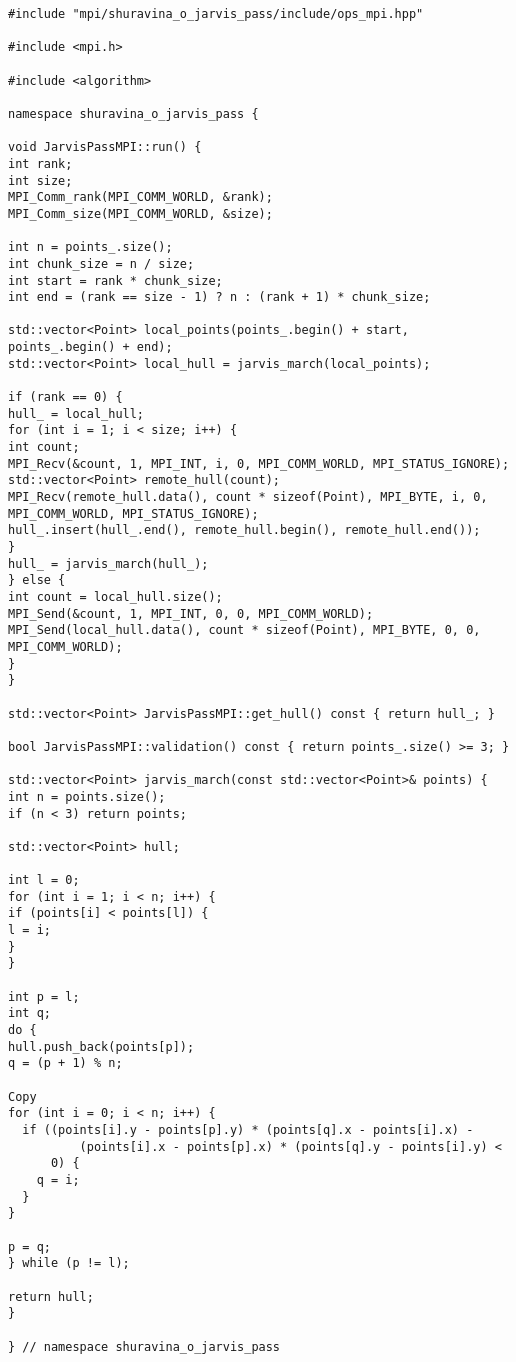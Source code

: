 \documentclass[12pt]{article}
\begin{document}
\newpage

\begin{lstlisting}[caption={ops_mpi_.cpp}]
#include "mpi/shuravina_o_jarvis_pass/include/ops_mpi.hpp"

#include <mpi.h>

#include <algorithm>

namespace shuravina_o_jarvis_pass {

void JarvisPassMPI::run() {
int rank;
int size;
MPI_Comm_rank(MPI_COMM_WORLD, &rank);
MPI_Comm_size(MPI_COMM_WORLD, &size);

int n = points_.size();
int chunk_size = n / size;
int start = rank * chunk_size;
int end = (rank == size - 1) ? n : (rank + 1) * chunk_size;

std::vector<Point> local_points(points_.begin() + start, points_.begin() + end);
std::vector<Point> local_hull = jarvis_march(local_points);

if (rank == 0) {
hull_ = local_hull;
for (int i = 1; i < size; i++) {
int count;
MPI_Recv(&count, 1, MPI_INT, i, 0, MPI_COMM_WORLD, MPI_STATUS_IGNORE);
std::vector<Point> remote_hull(count);
MPI_Recv(remote_hull.data(), count * sizeof(Point), MPI_BYTE, i, 0, MPI_COMM_WORLD, MPI_STATUS_IGNORE);
hull_.insert(hull_.end(), remote_hull.begin(), remote_hull.end());
}
hull_ = jarvis_march(hull_);
} else {
int count = local_hull.size();
MPI_Send(&count, 1, MPI_INT, 0, 0, MPI_COMM_WORLD);
MPI_Send(local_hull.data(), count * sizeof(Point), MPI_BYTE, 0, 0, MPI_COMM_WORLD);
}
}

std::vector<Point> JarvisPassMPI::get_hull() const { return hull_; }

bool JarvisPassMPI::validation() const { return points_.size() >= 3; }

std::vector<Point> jarvis_march(const std::vector<Point>& points) {
int n = points.size();
if (n < 3) return points;

std::vector<Point> hull;

int l = 0;
for (int i = 1; i < n; i++) {
if (points[i] < points[l]) {
l = i;
}
}

int p = l;
int q;
do {
hull.push_back(points[p]);
q = (p + 1) % n;

Copy
for (int i = 0; i < n; i++) {
  if ((points[i].y - points[p].y) * (points[q].x - points[i].x) -
          (points[i].x - points[p].x) * (points[q].y - points[i].y) <
      0) {
    q = i;
  }
}

p = q;
} while (p != l);

return hull;
}

} // namespace shuravina_o_jarvis_pass
\end{lstlisting}
\end{document}
